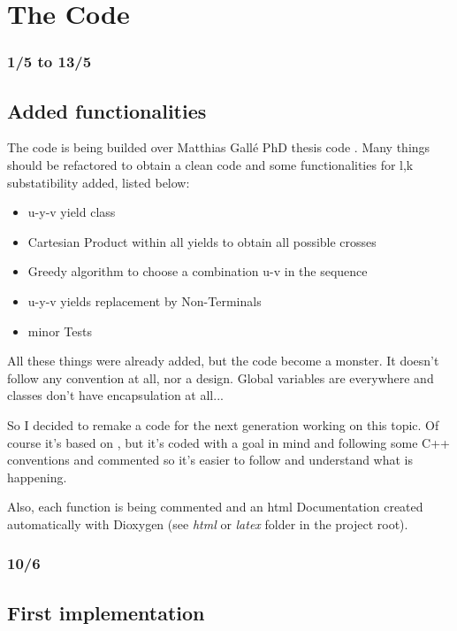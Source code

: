 \section{The Code}
\subsubsection{1/5 to 13/5}

\subsection{Added functionalities}

The code is being builded over Matthias Gallé PhD thesis code \cite{GThesis}. 
Many things should be refactored to obtain a clean code and some 
functionalities for l,k substatibility added, listed below:
\begin{itemize}
	\item u-y-v yield class
	\item Cartesian Product within all yields to obtain all possible crosses
	\item Greedy algorithm to choose a combination u-v in the sequence
	\item u-y-v yields replacement by Non-Terminals 
	\item minor Tests
\end{itemize} 

All these things were already added, but the code become a monster. It doesn't 
follow any convention at all, nor a design. Global variables are everywhere and
classes don't have encapsulation at all...

So I decided to remake a code for the next generation working on this topic. Of
course it's based on \cite{GThesis}, but it's coded with a goal in mind and following
some C++ conventions and commented so it's easier to follow and understand what
is happening.

Also, each function is being commented and an html Documentation created 
automatically with Dioxygen (see \emph{html} or \emph{latex} folder in the project root).

\subsubsection{10/6}

\subsection{First implementation}

